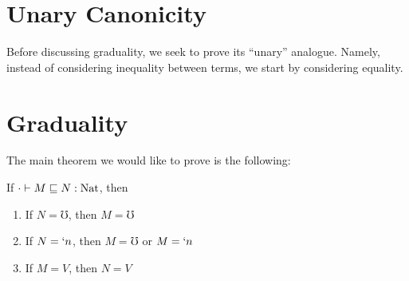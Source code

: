\section{Unary Canonicity}
Before discussing graduality, we seek to prove its ``unary'' analogue.
Namely, instead of considering inequality between terms, we start by considering equality.


\section{Graduality}\label{sec:graduality}
The main theorem we would like to prove is the following:

\begin{theorem}[Graduality]
  If $\cdot \vdash M \sqsubseteq N : \text{Nat}$, then
  \begin{enumerate}
    \item If $N = \mho$, then $M = \mho$
    \item If $N = `n$, then $M = \mho$ or $M = `n$
    \item If $M = V$, then $N = V$
  \end{enumerate}
\end{theorem}


